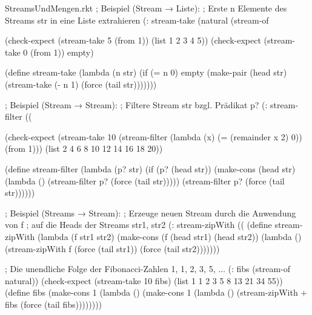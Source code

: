 \begin{filecontents*}{StreamsUndMengen.rkt}
; Beispiel (Stream → Liste):
; Erste n Elemente des Streams str in eine Liste extrahieren
(: stream-take (natural (stream-of %

(check-expect (stream-take 5 (from 1)) (list 1 2 3 4 5))
(check-expect (stream-take 0 (from 1)) empty)

(define stream-take
  (lambda (n str)
    (if (= n 0)
        empty
        (make-pair (head str) 
                   (stream-take (- n 1) (force (tail str)))))))

; Beispiel (Stream → Stream):
; Filtere Stream str bzgl. Prädikat p?
(: stream-filter ((%

(check-expect (stream-take 10 
                           (stream-filter (lambda (x) (= (remainder x 2) 0)) 
                                          (from 1)))
              (list 2 4 6 8 10 12 14 16 18 20))

(define stream-filter
  (lambda (p? str)
    (if (p? (head str))
        (make-cons (head str)
                   (lambda () (stream-filter p? (force (tail str)))))
        (stream-filter p? (force (tail str))))))










; Beispiel (Streams → Stream):
; Erzeuge neuen Stream durch die Anwendung von f
; auf die Heads der Streams str1, str2
(: stream-zipWith ((%
(define stream-zipWith
  (lambda (f str1 str2)
    (make-cons (f (head str1) (head str2))
               (lambda () (stream-zipWith f 
                                          (force (tail str1))
                                          (force (tail str2)))))))


; Die unendliche Folge der Fibonacci-Zahlen 1, 1, 2, 3, 5, ...
(: fibs (stream-of natural)) 
(check-expect (stream-take 10 fibs) (list 1 1 2 3 5 8 13 21 34 55))
(define fibs
  (make-cons 
   1
   (lambda ()
     (make-cons 
      1 
      (lambda ()
        (stream-zipWith +
                        fibs
                        (force (tail fibs))))))))
 
\end{filecontents*}
